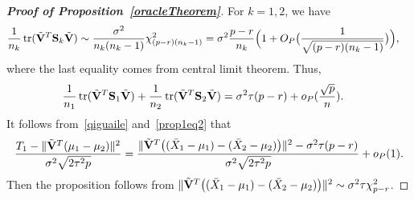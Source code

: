 \documentclass[review]{elsarticle}
\DeclareMathOperator{\mytr}{tr}
\theoremstyle{plain}
\theoremstyle{definition}
\theoremstyle{remark}
\begin{document}
\begin{appendices}
\begin{proof}[\textbf{Proof of Proposition~\ref{oracleTheorem}}]
    For $k=1,2$, we have
    \begin{equation*}
        \begin{aligned}
            &\frac{1}{n_k} \mytr(\tilde{\BV}^T \BS_k \tilde{\BV})\sim \frac{\sigma^2}{n_k(n_k-1)}\chi^2_{(p-r)(n_k-1)}
            =
            \sigma^2\frac{p-r}{n_k}\Big(1+O_P\big(\frac{1}{\sqrt{(p-r)(n_k-1)}}\big)\Big),
        \end{aligned}
    \end{equation*}
    where the last equality comes from central limit theorem. 
    Thus,
    \begin{equation}\label{prop1eq2}
        \begin{aligned}
            &\frac{1}{n_1} \mytr(\tilde{\BV}^T \BS_1 \tilde{\BV})+
            \frac{1}{n_2} \mytr(\tilde{\BV}^T \BS_2 \tilde{\BV})=\sigma^2 \tau (p-r)+o_P(\frac{\sqrt{p}}{n}).
        \end{aligned}
    \end{equation}
It follows from~\eqref{qiguaile} and~\eqref{prop1eq2} that
            $$
            \frac{T_1-\|\tilde{\mathbf{V}}^T(\mu_1-\mu_2)\|^2}{\sigma^2\sqrt{2\tau^2 p}}
            =
            \frac{\|\tilde{\mathbf{V}}^T \big( (\bar{X}_1-\mu_1)-(\bar{X}_2-\mu_2) \big)\|^2-
                \sigma^2 \tau (p-r)}{\sigma^2\sqrt{2\tau^2 p}}
                +o_P(1).
    $$
Then the proposition follows from
$\|\tilde{\mathbf{V}}^T \big( (\bar{X}_1-\mu_1)-(\bar{X}_2-\mu_2) \big)\|^2\sim \sigma^2\tau\chi^2_{p-r}$.
\end{proof}




\end{appendices}
\end{document}
